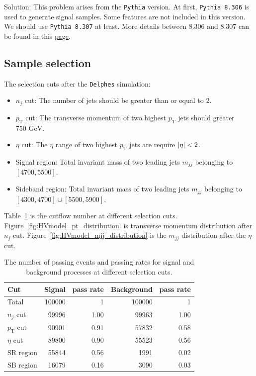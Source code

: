 \documentclass[12pt]{article}
\begin{document}
		Solution: This problem arises from the \verb|Pythia| version. At first, \verb|Pythia 8.306| is used to generate signal samples. Some features are not included in this version. We should use \verb|Pythia 8.307| at least. More details between 8.306 and 8.307 can be found in this \href{https://pythia.org/history/}{page}.
	\subsection{Sample selection}%
	\label{sub:sample_selection}
		The selection cuts after the \verb|Delphes| simulation:
		\begin{itemize}
			\item $n_j$ cut: The number of jets should be greater than or equal to 2.
			\item $p_{\text{T}}$ cut: The transverse momentum of two highest $p_{\text{T}}$ jets should greater $\text{750 GeV}$.
			\item $\eta$ cut: The $\eta$ range of two highest  $p_{\text{T}}$ jets are require $\abs{\eta} < 2$.
			\item Signal region: Total invariant mass of two leading jets $m_{jj}$ belonging to $[4700,5500]$. 
			\item Sideband region: Total invariant mass of two leading jets $m_{jj}$ belonging to $[4300,4700] \cup [5500,5900]$.
		\end{itemize}

		Table~\ref{tab:HVmodel_cutflow_number} is the cutflow number at different selection cuts. Figure~\ref{fig:HVmodel_pt_distribution} is transverse momentum distribution after $n_j$ cut. Figure~\ref{fig:HVmodel_mjj_distribution} is the $m_{jj}$ distribution after the $\eta$ cut.
		\begin{table}[htpb]
			\centering
			\caption{The number of passing events and passing rates for signal and background processes at different selection cuts.}
			\label{tab:HVmodel_cutflow_number}
			\begin{tabular}{l|rr|rr}
			Cut                & Signal & pass rate & Background & pass rate \\ \hline
			Total              & 100000  & 1         & 100000     & 1         \\
			$n_j$ cut          & 99996   & 1.00      & 99963      & 1.00      \\
			$p_{\text{T}}$ cut & 90901   & 0.91      & 57832      & 0.58      \\
			$\eta$ cut         & 89800   & 0.90      & 55523      & 0.56      \\ \hline
			SR region          & 55844   & 0.56      & 1991       & 0.02      \\
			SB region          & 16079   & 0.16      & 3090       & 0.03     
			\end{tabular}
		\end{table}
\end{document}
